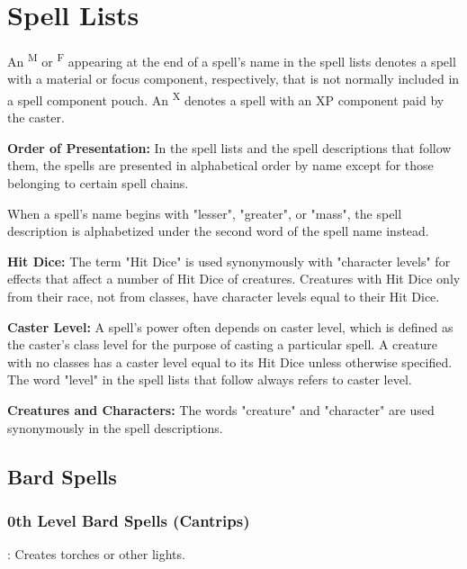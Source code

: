 \section{Spell Lists}

An \textsuperscript{M} or \textsuperscript{F} appearing 
at the end of a spell's name in the spell lists denotes a spell with a material 
or focus component, respectively, that is not normally included in a spell component 
pouch. An \textsuperscript{X} denotes a spell with an XP component 
paid by the caster.

\textbf{Order of Presentation:} In the spell lists and the spell descriptions that 
follow them, the spells are presented in alphabetical order by name except for 
those belonging to certain spell chains.

When a spell's name begins with "lesser", "greater", or "mass", the spell 
description is alphabetized under the second word of the spell name instead.

\textbf{Hit Dice:} The term "Hit Dice" is used synonymously with "character 
levels" for effects that affect a number of Hit Dice of creatures. Creatures with 
Hit Dice only from their race, not from classes, have character levels equal to 
their Hit Dice.

\textbf{Caster Level:} A spell's power often depends on caster level, which is 
defined as the caster's class level for the purpose of casting a particular spell. 
A creature with no classes has a caster level equal to its Hit Dice unless otherwise 
specified. The word "level" in the spell lists that follow always refers to caster 
level.

\textbf{Creatures and Characters:} The words "creature" and "character" are 
used synonymously in the spell descriptions.


\subsection{Bard Spells}

\subsubsection{0th Level Bard Spells (Cantrips)}

: Creates torches or other lights.

